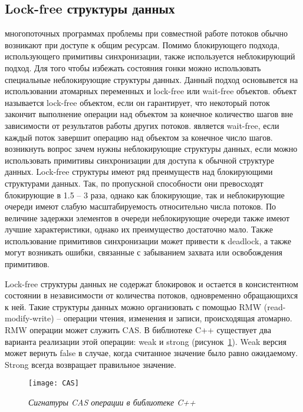 { %
	\subsection{Lock-free структуры данных}
	\label{lockfree:section}
	 многопоточных программах проблемы при совместной работе потоков обычно возникают при доступе к общим ресурсам. Помимо блокирующего подхода, использующего  примитивы синхронизации, также используется неблокирующий подход. Для того чтобы избежать состояния гонки можно использовать специальные неблокирующие структуры данных. Данный подход основывется на использовании атомарных переменных и lock-free или wait-free объектов.
	 объект называется lock-free объектом, если он гарантирует, что некоторый поток закончит выполнение операции над объектом за конечное количество шагов вне зависимости от результатов работы других потоков.
	 является wait-free, если каждый поток завершит операцию над объектом за конечное число шагов.
	 возникнуть вопрос зачем нужны неблокирующие структуры данных, если можно использовать примитивы синхронизации для доступа к обычной структуре данных. Lock-free структуры имеют ряд преимуществ над блокирующими структурами данных. Так, по пропускной способности они превосходят блокирующие в 1.5 -- 3 раза, однако как блокирующие, так и неблокирующие очереди имеют слабую масштабируемость относительно числа потоков. По величине задержки элементов в очереди неблокирующие очереди также имеют лучшие характеристики, однако их преимущество достаточно мало. Также использование примитивов синхронизации может привести к deadlock, а также могут возникать ошибки, связанные с забыванием захвата или освобождения примитивов.
	\par Lock-free структуры данных не содержат блокировок и остается в консистентном состоянии в независимости от количества потоков, одновременно обращающихся к ней. Такие структуры данных можно организовать с помощью RMW (read-modify-write) -- операции чтения, изменения и записи, происходящая атомарно.
	 RMW операции может служить CAS. В библиотеке C++ существует два варианта реализации этой операции: weak и strong (рисунок~\ref{CAS:image}). Weak версия может вернуть false в случае, когда считанное значение было равно ожидаемому. Strong всегда возвращает правильное значение.
	\begin{figure}[H]
		\texttt{[image: CAS]}
		\caption{\textit{Сигнатуры CAS операции в библиотеке C++}}
		\label{CAS:image}
	\end{figure}
}
